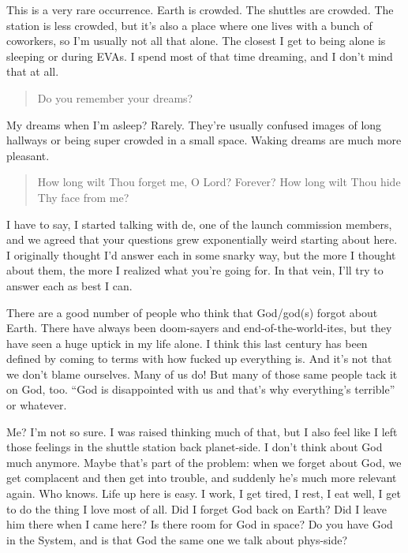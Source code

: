 \noindent This is a very rare occurrence. Earth is crowded. The shuttles are crowded. The station is less crowded, but it's also a place where one lives with a bunch of coworkers, so I'm usually not all that alone. The closest I get to being alone is sleeping or during EVAs. I spend most of that time dreaming, and I don't mind that at all.

\begin{quote}
Do you remember your dreams?
\end{quote}

\noindent My dreams when I'm asleep? Rarely. They're usually confused images of long hallways or being super crowded in a small space. Waking dreams are much more pleasant.

\begin{quote}
How long wilt Thou forget me, O Lord? Forever? How long wilt Thou hide Thy face from me?
\end{quote}

\noindent I have to say, I started talking with de, one of the launch commission members, and we agreed that your questions grew exponentially weird starting about here. I originally thought I'd answer each in some snarky way, but the more I thought about them, the more I realized what you're going for. In that vein, I'll try to answer each as best I can.

There are a good number of people who think that God/god(s) forgot about Earth. There have always been doom-sayers and end-of-the-world-ites, but they have seen a huge uptick in my life alone. I think this last century has been defined by coming to terms with how fucked up everything is. And it's not that we don't blame ourselves. Many of us do! But many of those same people tack it on God, too. ``God is disappointed with us and that's why everything's terrible'' or whatever.

Me? I'm not so sure. I was raised thinking much of that, but I also feel like I left those feelings in the shuttle station back planet-side. I don't think about God much anymore. Maybe that's part of the problem: when we forget about God, we get complacent and then get into trouble, and suddenly he's much more relevant again. Who knows. Life up here is easy. I work, I get tired, I rest, I eat well, I get to do the thing I love most of all. Did I forget God back on Earth? Did I leave him there when I came here? Is there room for God in space? Do you have God in the System, and is that God the same one we talk about phys-side?

